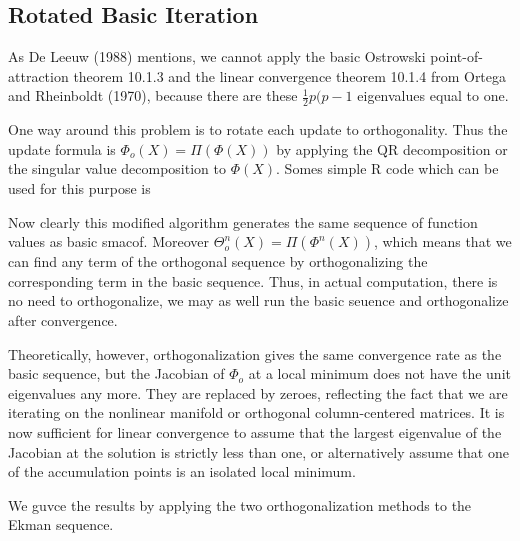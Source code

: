 \documentclass[
  12pt,
]{article}
\newenvironment{Shaded}{\begin{snugshade}}{\end{snugshade}}
\newcommand{\DecValTok}[1]{\textcolor[rgb]{0.00,0.00,0.81}{#1}}
\newcommand{\FunctionTok}[1]{\textcolor[rgb]{0.13,0.29,0.53}{\textbf{#1}}}
\newcommand{\NormalTok}[1]{#1}
\newcommand{\OtherTok}[1]{\textcolor[rgb]{0.56,0.35,0.01}{#1}}
\newcommand{\SpecialCharTok}[1]{\textcolor[rgb]{0.81,0.36,0.00}{\textbf{#1}}}
\begin{document}
\subsection{Rotated Basic Iteration}\label{rotated-basic-iteration}

As De Leeuw (1988) mentions, we cannot apply the basic Ostrowski point-of-attraction theorem 10.1.3 and the linear convergence theorem 10.1.4 from Ortega and Rheinboldt (1970), because there are these \(\frac12 p(p-1\) eigenvalues equal to one.

One way around this problem is to rotate each update to orthogonality. Thus the
update formula is \(\Phi_o(X)=\Pi(\Phi(X))\) by
applying the QR decomposition or the singular value decomposition to
\(\Phi(X)\). Somes simple R code which can be used for this purpose is

\begin{Shaded}
\end{Shaded}

Now clearly this modified algorithm generates the same sequence of
function values as basic smacof. Moreover \(\Theta^n_o(X)=\Pi(\Phi^n(X))\),
which means that we can find any term of the orthogonal sequence
by orthogonalizing the corresponding term in the basic sequence.
Thus, in actual computation, there is no need to orthogonalize, we
may as well run the basic seuence and orthogonalize after
convergence.

Theoretically, however, orthogonalization gives the same
convergence rate as the basic sequence, but the Jacobian
of \(\Phi_o\) at a local minimum does not have the unit
eigenvalues any more. They are replaced by zeroes, reflecting
the fact that we are iterating on the nonlinear manifold
or orthogonal column-centered matrices. It is now sufficient
for linear convergence to assume that the largest
eigenvalue of the Jacobian at the solution is strictly
less than one, or alternatively assume that one of the accumulation
points is an isolated local minimum.

We guvce the results by applying the two orthogonalization methods
to the Ekman sequence.
\end{document}
